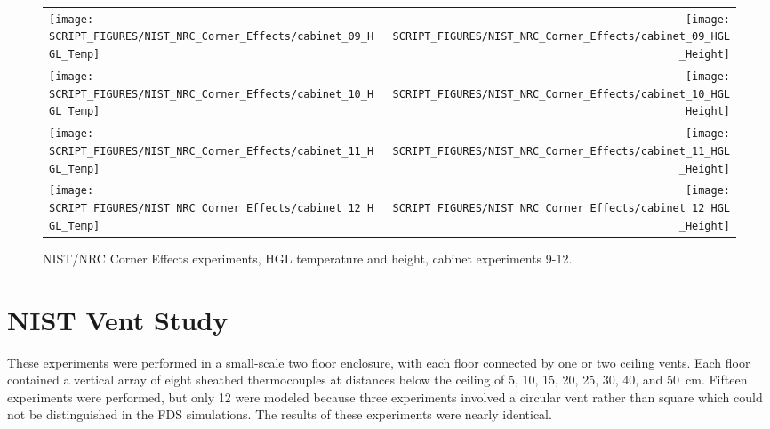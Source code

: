 \begin{figure}[p]
\begin{tabular*}{\textwidth}{l@{\extracolsep{\fill}}r}
\texttt{[image: SCRIPT\_FIGURES/NIST\_NRC\_Corner\_Effects/cabinet\_09\_HGL\_Temp]} &
\texttt{[image: SCRIPT\_FIGURES/NIST\_NRC\_Corner\_Effects/cabinet\_09\_HGL\_Height]} \\
\texttt{[image: SCRIPT\_FIGURES/NIST\_NRC\_Corner\_Effects/cabinet\_10\_HGL\_Temp]} &
\texttt{[image: SCRIPT\_FIGURES/NIST\_NRC\_Corner\_Effects/cabinet\_10\_HGL\_Height]} \\
\texttt{[image: SCRIPT\_FIGURES/NIST\_NRC\_Corner\_Effects/cabinet\_11\_HGL\_Temp]} &
\texttt{[image: SCRIPT\_FIGURES/NIST\_NRC\_Corner\_Effects/cabinet\_11\_HGL\_Height]} \\
\texttt{[image: SCRIPT\_FIGURES/NIST\_NRC\_Corner\_Effects/cabinet\_12\_HGL\_Temp]} &
\texttt{[image: SCRIPT\_FIGURES/NIST\_NRC\_Corner\_Effects/cabinet\_12\_HGL\_Height]}
\end{tabular*}
\caption[NIST/NRC Corner Effects, HGL temperature and height, cabinet experiments 9-12]
{NIST/NRC Corner Effects experiments, HGL temperature and height, cabinet experiments 9-12.}
\label{NIST_NRC_Cabinet_3}
\end{figure}


\clearpage

\section{NIST Vent Study}

These experiments were performed in a small-scale two floor enclosure, with each floor connected by one or two ceiling vents. Each floor contained a vertical array of eight sheathed thermocouples at distances below the ceiling of 5, 10, 15, 20, 25, 30, 40, and 50~cm. Fifteen experiments were performed, but only 12 were modeled because three experiments involved a circular vent rather than square which could not be distinguished in the FDS simulations. The results of these experiments were nearly identical.

\newpage

